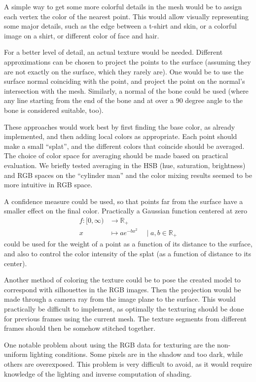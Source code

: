 A simple way to get some more colorful details in the mesh would be to assign each vertex the color of the nearest point. This would allow visually representing some major details, such as the edge between a t-shirt and skin, or a colorful image on a shirt, or different color of face and hair.

For a better level of detail, an actual texture would be needed. Different approximations can be chosen to project the points to the surface (assuming they are not exactly on the surface, which they rarely are). One would be to use the surface normal coinciding with the point, and project the point on the normal's intersection with the mesh. Similarly, a normal of the bone could be used (where any line starting from the end of the bone and at over a 90 degree angle to the bone is considered suitable, too).

These approaches would work best by first finding the base color, as already implemented, and then adding local colors as appropriate. Each point should make a small ``splat'', and the different colors that coincide should be averaged. The choice of color space for averaging should be made based on practical evaluation. We briefly tested averaging in the HSB (hue, saturation, brightness) and RGB spaces on the ``cylinder man'' and the color mixing results seemed to be more intuitive in RGB space.

A confidence measure could be used, so that points far from the surface have a smaller effect on the final color. Practically a Gaussian function centered at zero
\begin{align*}
    f \colon [0, \infty) & \to \mathbb{R}_+ \\
                       x & \mapsto a e^{-b x^2}
                            \quad \mid a, b \in \mathbb{R}_+
\end{align*}
could be used for the weight of a point as a function of its distance to the surface, and also to control the color intensity of the splat (as a function of distance to its center).

Another method of coloring the texture could be to pose the created model to correspond with silhouettes in the RGB images. Then the projection would be made through a camera ray from the image plane to the surface. This would practically be difficult to implement, as optimally the texturing should be done for previous frames using the current mesh. The texture segments from different frames should then be somehow stitched together.

One notable problem about using the RGB data for texturing are the non-uniform lighting conditions. Some pixels are in the shadow and too dark, while others are overexposed. This problem is very difficult to avoid, as it would require knowledge of the lighting and inverse computation of shading.


